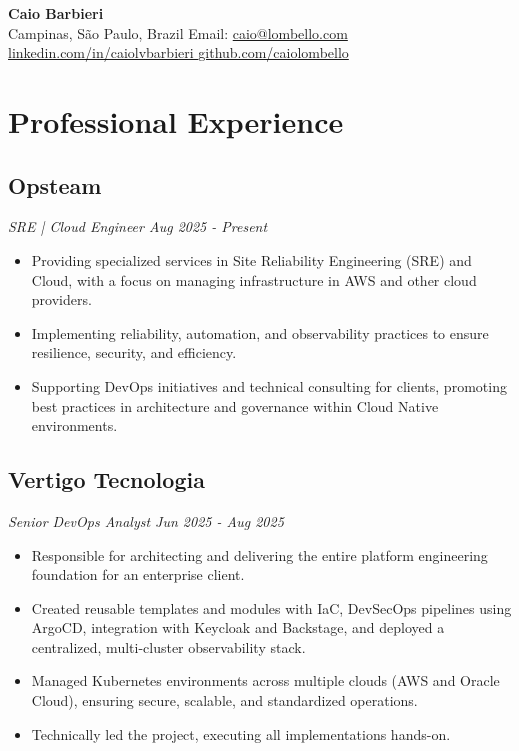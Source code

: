 \documentclass[a4paper,10pt]{article}
\begin{document}
\begin{center}
{\LARGE \textbf{ Caio Barbieri }}
\\ [0.1cm]
Campinas, São Paulo, Brazil
{\textbullet}
Email: \href{mailto:caio@lombello.com }{ caio@lombello.com }
{\textbullet}
\href{ https://linkedin.com/in/caiolvbarbieri }{linkedin.com/in/caiolvbarbieri }
{\textbullet}
\href{ https://github.com/caiolombello }{github.com/caiolombello }
\end{center}


\section{ Professional Experience }
\subsection*{\texorpdfstring{
\textbf{ Opsteam } \hfill 
}{
Opsteam -- 
}}
\textit{ SRE | Cloud Engineer \hfill Aug 2025 - Present }
\begin{itemize}
\item Providing specialized services in Site Reliability Engineering (SRE) and Cloud, with a focus on managing infrastructure in AWS and other cloud providers.
\item Implementing reliability, automation, and observability practices to ensure resilience, security, and efficiency.
\item Supporting DevOps initiatives and technical consulting for clients, promoting best practices in architecture and governance within Cloud Native environments.
\end{itemize}
\subsection*{\texorpdfstring{
\textbf{ Vertigo Tecnologia } \hfill 
}{
Vertigo Tecnologia -- 
}}
\textit{ Senior DevOps Analyst \hfill Jun 2025 - Aug 2025 }
\begin{itemize}
\item Responsible for architecting and delivering the entire platform engineering foundation for an enterprise client.
\item Created reusable templates and modules with IaC, DevSecOps pipelines using ArgoCD, integration with Keycloak and Backstage, and deployed a centralized, multi-cluster observability stack.
\item Managed Kubernetes environments across multiple clouds (AWS and Oracle Cloud), ensuring secure, scalable, and standardized operations.
\item Technically led the project, executing all implementations hands-on.
\end{itemize}
\end{document}

